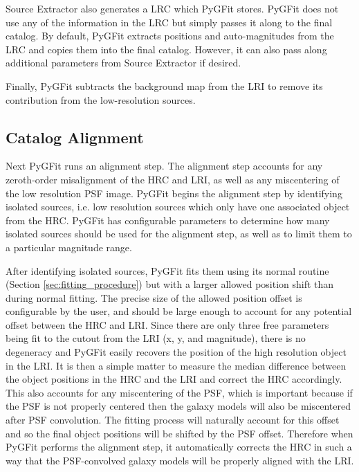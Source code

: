 \documentclass[apj]{emulateapj}
\newcommand{\pygfit}{PyGFit}
\newcommand{\extractor}{Source Extractor}
\begin{document}
\extractor{} also generates a LRC which \pygfit{} stores.  \pygfit{} does not use any of the information in the LRC but simply passes it along to the final catalog.  By default, \pygfit{} extracts positions and auto-magnitudes from the LRC and copies them into the final catalog.  However, it can also pass along additional parameters from \extractor{} if desired.

Finally, \pygfit{} subtracts the background map from the LRI to remove its contribution from the low-resolution sources.

\subsection{Catalog Alignment}\label{sec:alignment}

Next \pygfit{} runs an alignment step.  The alignment step accounts for any zeroth-order misalignment of the HRC and LRI, as well as any miscentering of the low resolution PSF image.  \pygfit{} begins the alignment step by identifying isolated sources, i.e. low resolution sources which only have one associated object from the HRC.  \pygfit{} has configurable parameters to determine how many isolated sources should be used for the alignment step, as well as to limit them to a particular magnitude range.

After identifying isolated sources, \pygfit{} fits them using its normal routine (Section \ref{sec:fitting_procedure}) but with a larger allowed position shift than during normal fitting.  The precise size of the allowed position offset is configurable by the user, and should be large enough to account for any potential offset between the HRC and LRI.  Since there are only three free parameters being fit to the cutout from the LRI (x, y, and magnitude), there is no degeneracy and \pygfit{} easily recovers the position of the high resolution object in the LRI.  It is then a simple matter to measure the median difference between the object positions in the HRC and the LRI and correct the HRC accordingly.  This also accounts for any miscentering of the PSF, which is important because if the PSF is not properly centered then the galaxy models will also be miscentered after PSF convolution.  The fitting process will naturally account for this offset and so the final object positions will be shifted by the PSF offset.  Therefore when \pygfit{} performs the alignment step, it automatically corrects the HRC in such a way that the PSF-convolved galaxy models will be properly aligned with the LRI.
\end{document}
